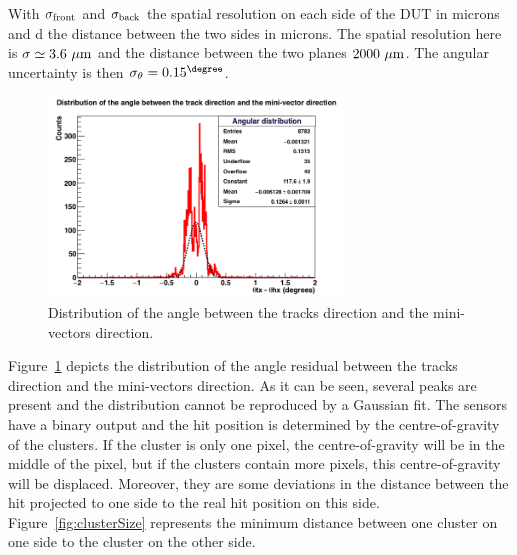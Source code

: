    With $\sigma_{\rm{front}}$ and $\sigma_{\rm{back}}$ the spatial resolution on each side of the \gls{DUT} in microns and d the distance between the two sides in microns.
   The spatial resolution here is $\sigma \simeq 3.6~\rm{\mu m}$ and the distance between the two planes $2000~\rm{\mu m}$.
   The angular uncertainty is then $\sigma_{\theta} = 0.15^{\degree}$.  
   
   \begin{figure}[!h]
     \centering
     \includegraphics[width = 0.7\textwidth]{Pictures/deformation/hDiffAngleX_226056.png}
     \caption{Distribution of the angle between the tracks direction and the mini-vectors direction.}
     \label{fig:angRes}
   \end{figure}

   Figure~\ref{fig:angRes} depicts the distribution of the angle residual between the tracks direction and the mini-vectors direction.
   As it can be seen, several peaks are present and the distribution cannot be reproduced by a Gaussian fit.
   The sensors have a binary output and the hit position is determined by the centre-of-gravity of the clusters.
   If the cluster is only one pixel, the centre-of-gravity will be in the middle of the pixel, but if the clusters contain more pixels, this centre-of-gravity will be displaced.
   Moreover, they are some deviations in the distance between the hit projected to one side to the real hit position on this side.
   Figure~\ref{fig:clusterSize} represents the minimum distance between one cluster on one side to the cluster on the other side.
   
